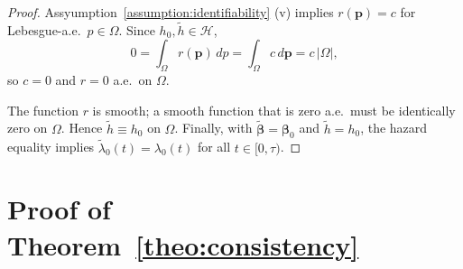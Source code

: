 \documentclass[11pt]{article}
\begin{document}
\begin{proof}
	Assyumption~\ref{assumption:identifiability} (v) implies $r(\bm p)=c$ for Lebesgue-a.e.\ $p\in\Omega$. 	Since $h_0,\tilde h\in\mathcal H$,
	\[
	0=\int_\Omega r(\bm p)\,dp=\int_\Omega c\,d\bm p=c\,|\Omega|,
	\]
	so $c=0$ and $r=0$ a.e.\ on $\Omega$.
	
	The function $r$ is smooth; a smooth function that is zero a.e.\ must be 
	identically zero on $\Omega$. Hence $\tilde h\equiv h_0$ on $\Omega$. Finally, with $\tilde{\bm \beta}=\bm \beta_0$ and $\tilde h=h_0$, the hazard 
	equality implies $\tilde\lambda_0(t)=\lambda_0(t)$ for all $t\in[0,\tau)$.	
	\end{proof}
\section{Proof of Theorem~\ref{theo:consistency}}\label{appendix:consistency}	
\end{document}
